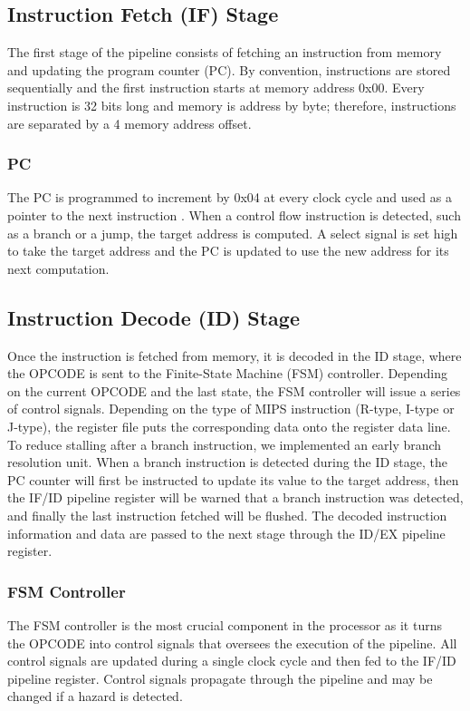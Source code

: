 \documentclass[conference]{IEEEtran}
\begin{document}
\subsection{Instruction Fetch (IF) Stage}

The first stage of the pipeline consists of fetching an instruction from memory and updating the program counter (PC). By convention, instructions are stored sequentially and the first instruction starts at memory address 0x00. Every instruction is 32 bits long and memory is address by byte; therefore, instructions are separated by a 4 memory address offset.

\subsubsection{PC} 
The PC is programmed to increment by 0x04 at every clock cycle and used as a pointer to the next instruction . When a control flow instruction is detected, such as a branch or a jump, the target address is computed. A select signal is set high to take the target address and the PC is updated to use the new address for its next computation.

\subsection{Instruction Decode (ID) Stage}

Once the instruction is fetched from memory, it is decoded in the ID stage, where the OPCODE is sent to the Finite-State Machine (FSM) controller. Depending on the current OPCODE and the last state, the FSM controller will issue a series of control signals.  Depending on the type of MIPS instruction (R-type, I-type or J-type), the register file puts the corresponding data onto the register data line. To reduce stalling after a branch instruction, we implemented an early branch resolution unit. When a branch instruction is detected during the ID stage, the PC counter will first be instructed to update its value to the target address, then the IF/ID pipeline register will be warned that a branch instruction was detected, and finally the last instruction fetched will be flushed. The decoded instruction information and data are passed to the next stage through the ID/EX pipeline register.

\subsubsection{FSM Controller}
The FSM controller is the most crucial component in the processor as it turns the OPCODE into control signals that oversees the execution of the pipeline. All control signals are updated during a single clock cycle and then fed to the IF/ID pipeline register. Control signals propagate through the pipeline and may be changed if a hazard is detected. 
\end{document}
